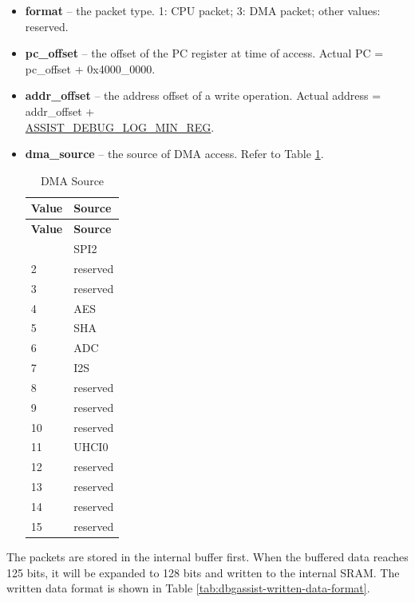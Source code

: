 \documentclass[main\_\_EN.tex]{subfiles}
\begin{document}
\begin{itemize}
    \item {\bfseries format} – the packet type. 1: CPU packet; 3: DMA packet; other values: reserved.
    \item {\bfseries pc\_offset} – the offset of the PC register at time of access. Actual PC = pc\_offset + 0x4000\_0000.
    \item {\bfseries addr\_offset} – the address offset of a write operation. Actual address = addr\_offset +\\ \hyperref[regdesc:ASSISTDEBUGLOGMINREG]{ASSIST\_DEBUG\_LOG\_MIN\_REG}.
    \item {\bfseries dma\_source} – the source of DMA access. Refer to Table  \ref{tab:dbgassist-dma-source}.
    
        \begin{longtable}[c]{|l|l|}
        \caption{DMA Source}\label{tab:dbgassist-dma-source}
        \\\hline
        \rowcolor{lightgray}
        {\bfseries Value} & {\bfseries Source} \\\hline
        \endfirsthead \hline \rowcolor{lightgray}
        {\bfseries Value} & {\bfseries Source} \\\hline
        \endhead \endfoot \hline \endlastfoot
        1 & SPI2 \\\hline
        2 & reserved \\\hline
        3 & reserved \\\hline
        4 & AES \\\hline
        5 & SHA \\\hline 
        6 & ADC \\\hline
        7 & I2S \\\hline 
        8 & reserved \\\hline
        9 & reserved \\\hline
        10 & reserved \\\hline
        11 & UHCI0 \\\hline
        12 & reserved \\\hline
        13 & reserved \\\hline
        14 & reserved \\\hline
        15 & reserved \\\hline 
        \end{longtable}
\end{itemize}    

The packets are stored in the internal buffer first. When the buffered data reaches 125 bits, it will be expanded to 128 bits and written to the internal SRAM. The written data format is shown in Table \ref{tab:dbgassist-written-data-format}.
        
\end{document}
